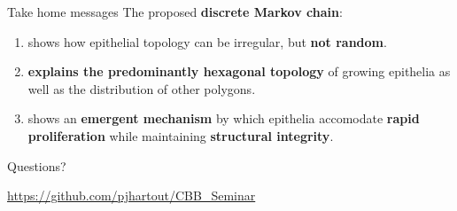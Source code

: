 \documentclass[aspectratio=169, 10pt]{beamer}
\begin{document}
\begin{frame}[fragile]{Take home messages} 
  The proposed \textbf{discrete Markov chain}:
  \begin{enumerate}
    \item shows how epithelial topology can be irregular, but \textbf{not random}.
    \item \textbf{explains the predominantly hexagonal topology} of growing epithelia as well as the distribution of other polygons.
    \item shows an \textbf{emergent mechanism} by which epithelia accomodate \textbf{rapid proliferation} while maintaining \textbf{structural integrity}.
  \end{enumerate}
\end{frame}

\begin{frame}[standout]
  Questions?
  \vspace{3cm}
  \begin{center}{\Large {}} \normalsize\url{https://github.com/pjhartout/CBB_Seminar}\end{center}
\end{frame}

\appendix
\end{document}
